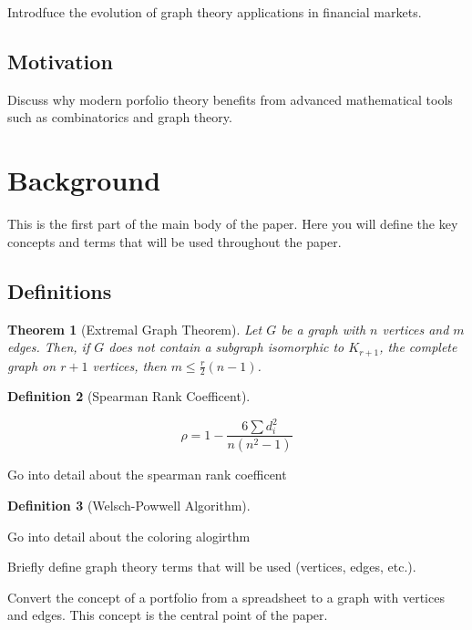 \documentclass{article}
\newtheorem{theorem}{Theorem}[section]
\newtheorem{definition}[theorem]{Definition}
\begin{document}
Introdfuce the evolution of graph theory applications in financial markets. 

\subsection{Motivation}

Discuss why modern porfolio theory benefits from advanced mathematical tools such as combinatorics and graph theory.


\section{Background}

This is the first part of the main body of the paper. Here you will define the key concepts and terms that will be used throughout the paper.

\subsection{Definitions}


\begin{theorem}[Extremal Graph Theorem]
    Let $G$ be a graph with $n$ vertices and $m$ edges. Then, if $G$ does not contain a subgraph isomorphic to $K_{r+1}$, the complete graph on $r+1$ vertices, then $m \leq \frac{r}{2}(n-1)$.
\end{theorem}


\begin{definition}[Spearman Rank Coefficent]
\end{definition}

\[
\rho = 1 - \frac{6 \sum d_i^2}{n(n^2-1)}
\]

Go into detail about the spearman rank coefficent


\begin{definition}[Welsch-Powwell Algorithm]
\end{definition}

Go into detail about the coloring alogirthm



Briefly define graph theory terms that will be used (vertices, edges, etc.). 


Convert the concept of a portfolio from a spreadsheet to a graph with vertices and edges. This concept is the central point of the paper.
\end{document}
